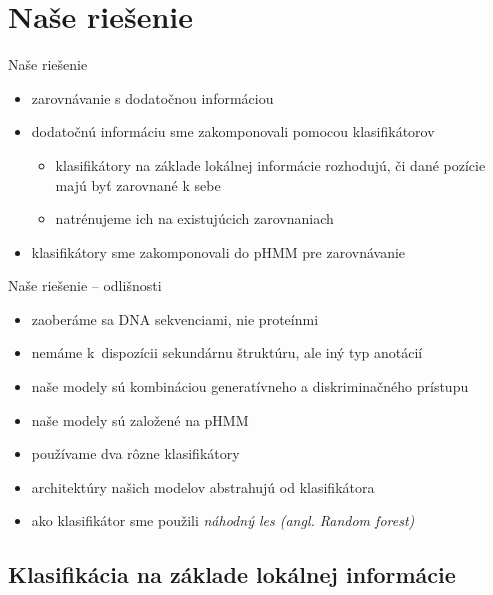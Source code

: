 \documentclass[xcolor=dvipsnames, compress, 12pt]{beamer}
\theoremstyle{definition}
\begin{document}
\section{Naše riešenie}
\begin{frame}{Naše riešenie}
  \begin{itemize}
    \item zarovnávanie s dodatočnou informáciou
    \item dodatočnú informáciu sme zakomponovali pomocou klasifikátorov
    \begin{itemize}
      \item klasifikátory na základe lokálnej informácie rozhodujú, či dané pozície majú byť zarovnané k sebe
      \item natrénujeme ich na existujúcich zarovnaniach
    \end{itemize}
    \item klasifikátory sme zakomponovali do pHMM pre zarovnávanie
  \end{itemize}
\end{frame}

\begin{frame}{Naše riešenie -- odlišnosti}
  \begin{itemize}
    \item zaoberáme sa DNA sekvenciami, nie proteínmi
    \item nemáme k~dispozícii sekundárnu štruktúru, ale iný typ anotácií
    \item naše modely sú kombináciou generatívneho a diskriminačného prístupu
    \item naše modely sú založené na pHMM
    \item používame dva rôzne klasifikátory
    \item architektúry našich modelov abstrahujú od klasifikátora
    \item ako klasifikátor sme použili \emph{náhodný les (angl. Random forest)} \cite{randomForestPaper}
  \end{itemize}
\end{frame}

\subsection{Klasifikácia na základe lokálnej informácie}
\end{document}
